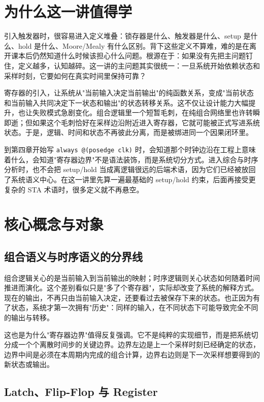 \documentclass[11pt,a4paper]{article}
\begin{document}
\section{为什么这一讲值得学}

引入触发器时，很容易进入定义堆叠：锁存器是什么、触发器是什么、setup 是什么、hold 是什么、Moore/Mealy 有什么区别。背下这些定义不算难，难的是在离开课本后仍然知道什么时候该担心什么问题。根源在于：如果没有先把主问题钉住，定义越多，认知越碎。这一讲的主问题其实很统一：一旦系统开始依赖状态和采样时刻，它要如何在真实时间里保持可靠？

寄存器的引入，让系统从"当前输入决定当前输出"的纯函数关系，变成"当前状态和当前输入共同决定下一状态和输出"的状态转移关系。这不仅让设计能力大幅提升，也让失败模式急剧变化。组合逻辑里一个短暂毛刺，在纯组合网络里也许转瞬即逝；但如果这个毛刺恰好在采样边沿附近进入寄存器，它就可能被正式写进系统状态。于是，逻辑、时间和状态不再彼此分离，而是被绑进同一个因果闭环里。

到第四章开始写 \texttt{always @(posedge clk)} 时，会知道那个时钟边沿在工程上意味着什么，会知道"寄存器边界"不是语法装饰，而是系统切分方式。进入综合与时序分析时，也不会把 setup/hold 当成离逻辑很远的后端术语，因为它们已经被放回了系统语义中心。在这一讲里先算一遍最基础的 setup/hold 约束，后面再接受更复杂的 STA 术语时，很多定义就不再悬空。

\section{核心概念与对象}

\subsection{组合语义与时序语义的分界线}

组合逻辑关心的是当前输入到当前输出的映射；时序逻辑则关心状态如何随着时间推进而演化。这个差别看似只是"多了个寄存器"，实际却改变了系统的解释方式。现在的输出，不再只由当前输入决定，还要看过去被保存下来的状态。也正因为有了状态，系统才第一次拥有"历史"：同样的输入，在不同状态下可能导致完全不同的输出与转移。

这也是为什么"寄存器边界"值得反复强调。它不是纯粹的实现细节，而是把系统切分成一个个离散时间步的关键边界。边界左边是上一个采样时刻已经确定的状态，边界中间是必须在本周期内完成的组合计算，边界右边则是下一次采样想要得到的新状态或输出。

\subsection{Latch、Flip-Flop 与 Register}
\end{document}
